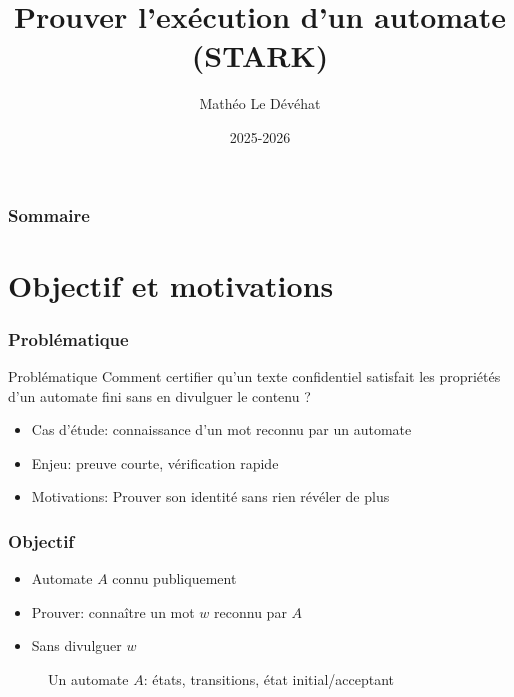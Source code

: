 \documentclass{beamer}
\title{Prouver l'exécution d'un automate (STARK)}
\author{Mathéo Le Dévéhat}
\institute{23112}
\date{2025-2026}
\begin{document}
\frame{\titlepage}

\begin{frame}
\frametitle{Sommaire}
\tableofcontents
\end{frame}
\section{Objectif et motivations}

\begin{frame}
\frametitle{Problématique}

\begin{block}{Problématique}
Comment certifier qu'un texte confidentiel satisfait les propriétés d'un automate fini sans en
divulguer le contenu ?
\end{block}

\begin{itemize}
    \item Cas d'étude: connaissance d'un mot reconnu par un automate
    \item Enjeu: preuve courte, vérification rapide
    \item Motivations: Prouver son identité sans rien révéler de plus
\end{itemize}

\end{frame}

\begin{frame}
\frametitle{Objectif}

\begin{itemize}
    \item Automate $A$ connu publiquement
    \item Prouver: connaître un mot $w$ reconnu par $A$
    \item Sans divulguer $w$
\end{itemize}

\begin{figure}[h!]
  \centering
  \caption{Un automate $A$: états, transitions, état initial/acceptant}
\end{figure}

\end{frame}
\end{document}
